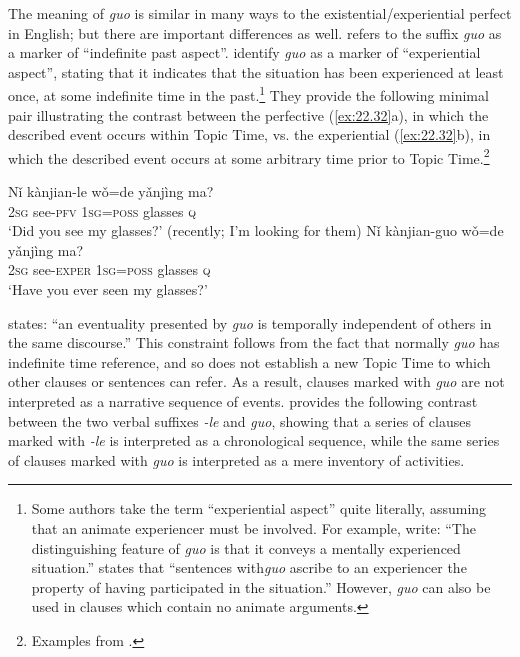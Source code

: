 The meaning of  \textit{guo} is similar in many ways to the existential\slash experiential perfect in English; but there are important differences as well. \citet{Chao1968} refers to the suffix \textit{guo} as a marker of “indefinite past aspect”. \citet[226]{LiThompson1981} identify \textit{guo} as a marker of “experiential aspect”, stating that it indicates that the situation has been experienced at least once, at some indefinite time in the past.\footnote{Some authors take the term “experiential aspect” quite literally, assuming that an animate experiencer must be involved. For example, \citet[144]{XiaoMcEnery2004} write: “The distinguishing feature of \textit{guo} is that it conveys a mentally experienced situation.” \citet[267]{Smith1997} states that “sentences with\textit{guo} ascribe to an experiencer the property of having participated in the situation.” However, \textit{guo} can also be used in clauses which contain no animate arguments.} They provide the following minimal pair illustrating the contrast between the perfective (\ref{ex:22.32}a), in which the described event occurs within Topic Time, vs. the experiential (\ref{ex:22.32}b), in which the described event occurs at some arbitrary time prior to Topic Time.\footnote{Examples from \textcites[19]{Ma1977}[227]{LiThompson1981}.}


\ea \label{ex:22.32}
\ea  \gll Nǐ  kànjian-le  wǒ=de  yǎnjìng  ma?\\
\textsc{2sg}  see-\textsc{pfv}  \textsc{1sg}=\textsc{poss}  glasses  \textsc{q}\\
\glt ‘Did you see my glasses?’ (recently; I’m looking for them)
\ex \gll  Nǐ  kànjian-guo  wǒ=de  yǎnjìng  ma?\\
\textsc{2sg}  see-\textsc{exper}  \textsc{1sg}=\textsc{poss}  glasses  \textsc{q}\\
\glt ‘Have you ever seen my glasses?’
\z \z


\citet{Wu2009} states: “an eventuality presented by \textit{guo} is temporally independent of others in the same discourse.” This constraint follows from the fact that normally \textit{guo} has indefinite time reference, and so does not establish a new Topic Time to which other clauses or sentences can refer. As a result, clauses marked with \textit{guo} are not interpreted as a narrative sequence of events. \citet[308]{Iljic1990} provides the following contrast between the two verbal suffixes \textit{-le} and \textit{guo}, showing that a series of clauses marked with \textit{-le} is interpreted as a chronological sequence, while the same series of clauses marked with \textit{guo} is interpreted as a mere inventory of activities.


